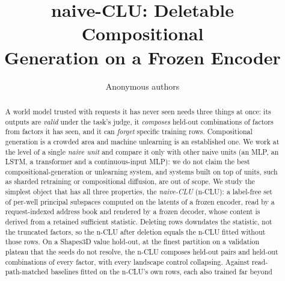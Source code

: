 \documentclass{article} %
\title{naive-CLU: Deletable Compositional\\ Generation on a Frozen Encoder}
\author{Anonymous authors}
\begin{document}
\maketitle

\begin{abstract}
A world model trusted with requests it has never seen needs three things at once: its outputs are \emph{valid} under the task's judge, it \emph{composes}
held-out combinations of factors from factors it has seen, and it can \emph{forget} specific
training rows. Compositional generation is a crowded area
and machine unlearning is an established one. We work at the level of a single \emph{naive unit} and
compare it only with other naive units (an MLP, an LSTM, a transformer and a continuous-input MLP):
we do not claim the best compositional-generation or unlearning system, and systems built on top of
units, such as sharded retraining or compositional diffusion, are out of scope.
We study the simplest object that has all three properties, the \emph{naive-CLU} (n-CLU): a
label-free set of per-well principal subspaces computed on the latents of a frozen
encoder, read by a request-indexed address book and rendered by a frozen decoder, whose
content is derived from a retained sufficient statistic. Deleting rows downdates the
statistic, not the truncated factors, so the n-CLU after deletion equals the n-CLU fitted
without those rows. On a Shapes3D value hold-out, at the finest partition on a validation plateau
that the seeds do not resolve, %
the n-CLU composes held-out pairs and held-out combinations of every factor, with every landscape
control collapsing. %
Against read-path-matched baselines fitted on the n-CLU's own rows, each also trained far beyond

\end{abstract}
\end{document}
